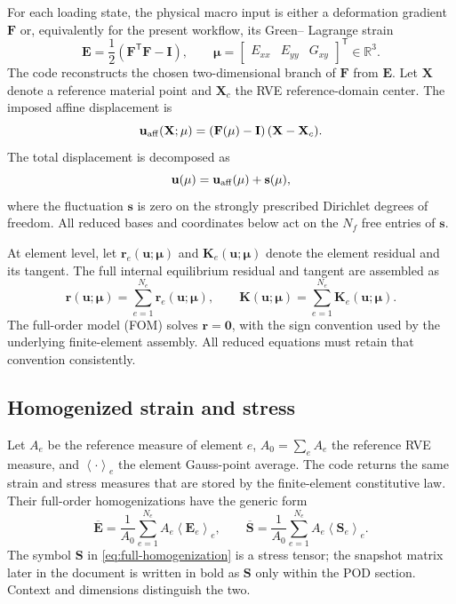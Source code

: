 \documentclass[11pt,a4paper]{article}
\newcommand{\R}{\mathbb{R}}
\newcommand{\transpose}{^{\mathsf T}}
\newcommand{\avg}[1]{\left\langle #1 \right\rangle}
\newcommand{\vect}[1]{\mathbf{#1}}
\newcommand{\mat}[1]{\mathbf{#1}}
\begin{document}
For each loading state, the physical macro input is either a deformation
gradient \(\mat F\) or, equivalently for the present workflow, its Green--
Lagrange strain
\begin{equation}
  \mat E
  = \frac{1}{2}\left(\mat F\transpose\mat F-\mat I\right),
  \qquad
  \vect\mu
  =
  \begin{bmatrix}
    E_{xx} & E_{yy} & G_{xy}
  \end{bmatrix}\transpose
  \in\R^3.
  \label{eq:macro-input}
\end{equation}
The code reconstructs the chosen two-dimensional branch of \(\mat F\) from
\(\mat E\).  Let \(\vect X\) denote a reference material point and
\(\vect X_c\) the RVE reference-domain center.  The imposed affine
displacement is
\begin{equation}
  \vect u_{\rm aff}(\vect X;\vect\mu)
  = \left(\mat F(\vect\mu)-\mat I\right)(\vect X-\vect X_c).
  \label{eq:affine-lifting}
\end{equation}
The total displacement is decomposed as
\begin{equation}
  \vect u(\vect\mu)
  = \vect u_{\rm aff}(\vect\mu)+\vect s(\vect\mu),
  \label{eq:state-decomposition}
\end{equation}
where the fluctuation \(\vect s\) is zero on the strongly prescribed
Dirichlet degrees of freedom.  All reduced bases and coordinates below act on
the \(N_f\) free entries of \(\vect s\).

At element level, let \(\vect r_e(\vect u;\vect\mu)\) and
\(\mat K_e(\vect u;\vect\mu)\) denote the element residual and its tangent.
The full internal equilibrium residual and tangent are assembled as
\begin{equation}
  \vect r(\vect u;\vect\mu)=\sum_{e=1}^{N_e}\vect r_e(\vect u;\vect\mu),
  \qquad
  \mat K(\vect u;\vect\mu)=\sum_{e=1}^{N_e}\mat K_e(\vect u;\vect\mu).
  \label{eq:full-assembly}
\end{equation}
The full-order model (FOM) solves \(\vect r=\vect 0\), with the sign
convention used by the underlying finite-element assembly.  All reduced
equations must retain that convention consistently.

\subsection{Homogenized strain and stress}

Let \(A_e\) be the reference measure of element \(e\), \(A_0=\sum_e A_e\)
the reference RVE measure, and \(\avg{\cdot}_e\) the element Gauss-point
average.  The code returns the same strain and stress measures that are
stored by the finite-element constitutive law.  Their full-order
homogenizations have the generic form
\begin{equation}
  \overline{\mat E}
  = \frac{1}{A_0}\sum_{e=1}^{N_e} A_e\avg{\mat E_e}_e,
  \qquad
  \overline{\mat S}
  = \frac{1}{A_0}\sum_{e=1}^{N_e} A_e\avg{\mat S_e}_e.
  \label{eq:full-homogenization}
\end{equation}
The symbol \(\mat S\) in \cref{eq:full-homogenization} is a stress tensor;
the snapshot matrix later in the document is written in bold as \(\mat S\)
only within the POD section.  Context and dimensions distinguish the two.
\end{document}
